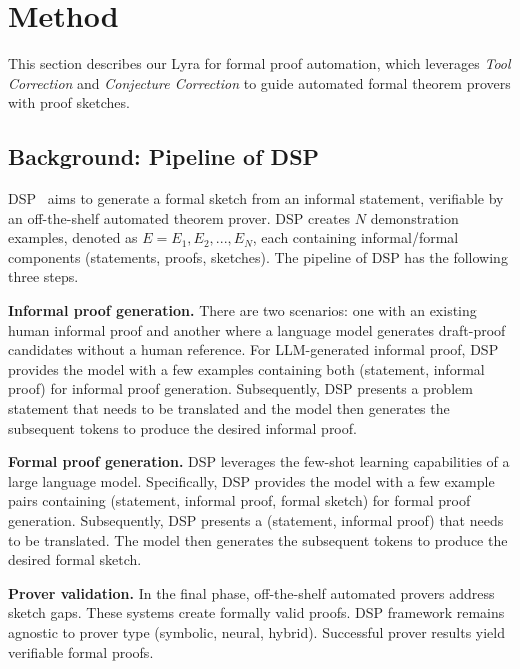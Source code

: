 \documentclass{article} \usepackage{iclr2024_conference,times}
\def\methodOneFull{\textit{Tool Correction}\xspace}
\def\methodTwoFull{\textit{Conjecture Correction}\xspace}
\def\fullname{Lyra\xspace}
\begin{document}
\section{Method}
This section describes our \fullname for formal proof automation, which leverages \methodOneFull and \methodTwoFull to guide automated formal theorem provers with proof sketches. 

\subsection{Background: Pipeline of DSP}
 DSP~\citep{jiang2023draft} aims to generate a formal sketch from an informal statement, verifiable by an off-the-shelf automated theorem prover. DSP creates $N$ demonstration examples, denoted as $E = {E_1, E_2, ..., E_N }$, each containing informal/formal components (statements, proofs, sketches). The pipeline of DSP has the following three steps.

\textbf{Informal proof generation.} There are two scenarios: one with an existing human informal proof and another where a language model generates draft-proof candidates without a human reference. For LLM-generated informal proof, DSP provides the model with a few examples containing both (statement, informal proof) for informal proof generation. Subsequently, DSP presents a problem statement that needs to be translated and the model then generates the subsequent tokens to produce the desired informal proof.

\textbf{Formal proof generation.} DSP leverages the few-shot learning capabilities of a large language model. Specifically, DSP provides the model with a few example pairs containing (statement, informal proof, formal sketch) for formal proof generation. Subsequently, DSP presents a (statement, informal proof) that needs to be translated. The model then generates the subsequent tokens to produce the desired formal sketch.

\textbf{Prover validation.} In the final phase, off-the-shelf automated provers address sketch gaps. These systems create formally valid proofs. DSP framework remains agnostic to prover type (symbolic, neural, hybrid). Successful prover results yield verifiable formal proofs.
\end{document}
